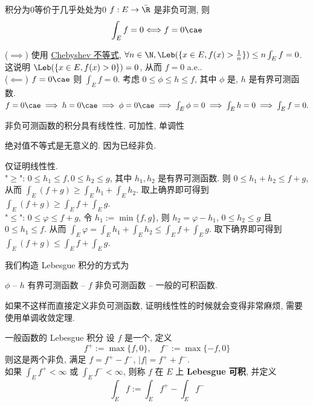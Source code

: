 \begin{ppt}
    {积分为0等价于几乎处处为0}
    \(f:E\to\bar{\R}\) 是非负可测, 则
    \[\int_E f=0 \Longleftrightarrow f=0 \cae\]
\end{ppt}
\begin{prf}
    (\(\implies\)) 使用 \hyperref[thm:chebyshev-inequality]{Chebyshev 不等式}, \(\forall n\in\N, \Leb(\{x\in E, f(x)>\frac{1}{n}\})\leq n \int_E f=0\). 这说明 \(\Leb(\{x\in E, f(x)>0\})=0\), 从而 \(f=0\) a.e..\\
    (\(\impliedby\)) \(f=0 \cae\) 则 \(\int_E f=0\). 考虑 \(0\leq\phi\leq h\leq f\), 其中 \(\phi\) 是\SimpleFunc{}, \(h\) 是有界可测函数. \(f=0\cae\implies h=0\cae\implies\phi=0\cae\implies\int_E\phi=0\implies\int_E h=0\implies\int_Ef=0. \)
\end{prf}
\begin{ppt}
    {非负可测函数的积分具有线性性, 可加性, 单调性}
\end{ppt}
\begin{rmk}
    绝对值不等式是无意义的. 因为已经非负.
\end{rmk}
\begin{prf}
    仅证明线性性. \\
    "\(\geq\)": \(0\leq h_1\leq f, 0\leq h_2\leq g\), 其中 \(h_1,h_2\) 是有界可测函数. 则 \(0\leq h_1+h_2\leq f+g\), 从而 \(\int_E (f+g)\geq \int_E h_1 + \int_E h_2\). 取上确界即可得到 \(\int_E (f+g)\geq \int_E f + \int_E g\).\\ 
    "\(\leq\)": \(0\leq \varphi\leq f+g\), 令 \(h_1:=\min\{f,g\}\), 则 \(h_2=\varphi-h_1\), \(0\leq h_2\leq g\) 且 \(0\leq h_1\leq f\). 从而 \(\int_E \varphi = \int_E h_1 + \int_E h_2 \leq \int_E f + \int_E g\). 取下确界即可得到 \(\int_E (f+g)\leq \int_E f + \int_E g\).
\end{prf}
\begin{rmk}
    我们构造 Lebesgue 积分的方式为
    \begin{center}
        \(\phi\) \SimpleFunc{} -- \(h\) 有界可测函数 -- \(f\) 非负可测函数 -- 一般的可积函数.
    \end{center}
    如果不这样而直接定义非负可测函数, 证明线性性的时候就会变得非常麻烦, 需要使用单调收敛定理.
\end{rmk}
\begin{dfn}
    {一般函数的 Lebesgue 积分}
    设 \(f\) 是一个\MeasurableFunc{}, 定义
    \[f^+:=\max\{f,0\}, \quad f^-:=\max\{-f,0\}\]
    则这是两个非负\MeasurableFunc{}, 满足 \(f=f^+-f^-\), \(|f|=f^++f^-\). \\
    如果 \(\int_E f^+<\infty\) 或 \(\int_E f^-<\infty\), 则称 \(f\) 在 \(E\) 上 \textbf{Lebesgue 可积}, 并定义
    \[\int_E f := \int_E f^+ - \int_E f^-\]
\end{dfn}

